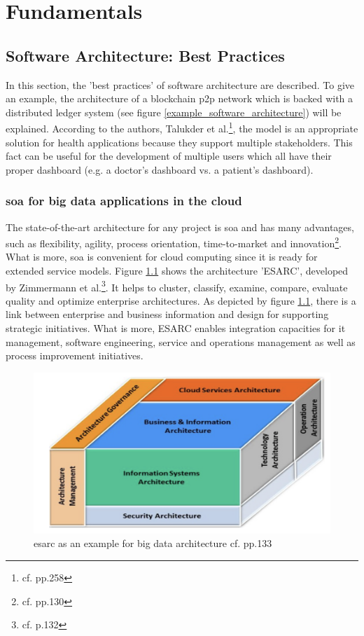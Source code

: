 \chapter{Fundamentals}\label{fundamentals}

\section{Software Architecture: Best Practices}

In this section, the 'best practices' of software architecture are described. To give an example, the architecture of a blockchain \ac{p2p} network which is backed with a distributed ledger system (see figure \ref{example_software_architecture}) will be explained. According to the authors, Talukder et al.\footnote{cf.\autocite{talukder} pp.258}, the model is an appropriate solution for health applications because they support multiple stakeholders. This fact can be useful for the development of multiple users which all have their proper dashboard (e.g. a doctor's dashboard vs. a patient's dashboard).

\subsection{\ac{soa} for big data applications in the cloud}
The state-of-the-art architecture for any project is \ac{soa} and has many advantages, such as flexibility, agility, process orientation, time-to-market and innovation\footnote{cf.\autocite{zimmermann} pp.130}. What is more, \ac{soa} is convenient for cloud computing since it is ready for extended service models.
Figure \ref{esarc_example} shows the architecture 'ESARC', developed by Zimmermann et al.\footnote{cf.\autocite{zimmermann} p.132}. It helps to cluster, classify, examine, compare, evaluate quality and optimize enterprise architectures. As depicted by figure \ref{esarc_example}, there is a link between enterprise and business information and design for supporting strategic initiatives. What is more, ESARC enables integration capacities for \ac{it} management, software engineering, service and operations management as well as process improvement initiatives.

\begin{figure}[h!]
	\centering
	\includegraphics[width=1\textwidth]{images/esarc_cube.png}
	\caption{\ac{esarc} as an example for big data architecture cf.\autocite{zimmermann} pp.133}
	\label{esarc_example}
\end{figure}

